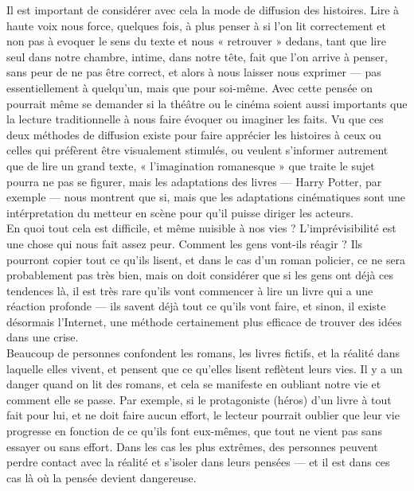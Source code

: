 \documentclass[12pt,a4paper]{article}
\begin{document}
Il est important de considérer avec cela la mode de diffusion des histoires.
Lire à haute voix nous force, quelques fois, à plus penser à si l'on lit
correctement et non pas à evoquer le sens du texte et nous « retrouver » dedans,
tant que lire seul dans notre chambre, intime, dans notre tête, fait que l'on
arrive à penser, sans peur de ne pas être correct, et alors à nous laisser nous
exprimer --- pas essentiellement à quelqu'un, mais que pour soi-même. Avec cette
pensée on pourrait même se demander si la théâtre ou le cinéma soient aussi
importants que la lecture traditionnelle à nous faire évoquer ou imaginer les
faits. Vu que ces deux méthodes de diffusion existe pour faire apprécier les
histoires à ceux ou celles qui préfèrent être visualement stimulés, ou veulent
s'informer autrement que de lire un grand texte, « l'imagination romanesque »
que traite le sujet pourra ne pas se figurer, mais les adaptations des livres ---
Harry Potter, par exemple --- nous montrent que si, mais que les adaptations
cinématiques sont une intérpretation du metteur en scène pour qu'il puisse
diriger les acteurs.\\

En quoi tout cela est difficile, et même nuisible à nos vies ? L'imprévisibilité
est une chose qui nous fait assez peur. Comment les gens vont-ils réagir ? Ils
pourront copier tout ce qu'ils lisent, et dans le cas d'un roman policier, ce ne
sera probablement pas très bien, mais on doit considérer que si les gens ont
déjà ces tendences là, il est très rare qu'ils vont commencer à lire un livre
qui a une réaction profonde --- ils savent déjà tout ce qu'ils vont faire, et
sinon, il existe désormais l'Internet, une méthode certainement plus efficace de
trouver des idées dans une crise.\\

Beaucoup de personnes confondent les romans, les livres fictifs, et la réalité
dans laquelle elles vivent, et pensent que ce qu'elles lisent reflètent leurs
vies. Il y a un danger quand on lit des romans, et cela se manifeste en oubliant
notre vie et comment elle se passe. Par exemple, si le protagoniste (héros) d'un
livre à tout fait pour lui, et ne doit faire aucun effort, le lecteur pourrait
oublier que leur vie progresse en fonction de ce qu'ils font eux-mêmes, que tout
ne vient pas sans essayer ou sans effort. Dans les cas les plus extrêmes, des
personnes peuvent perdre contact avec la réalité et s'isoler dans leurs pensées ---
et il est dans ces cas là où la pensée devient dangereuse.\\
\end{document}
